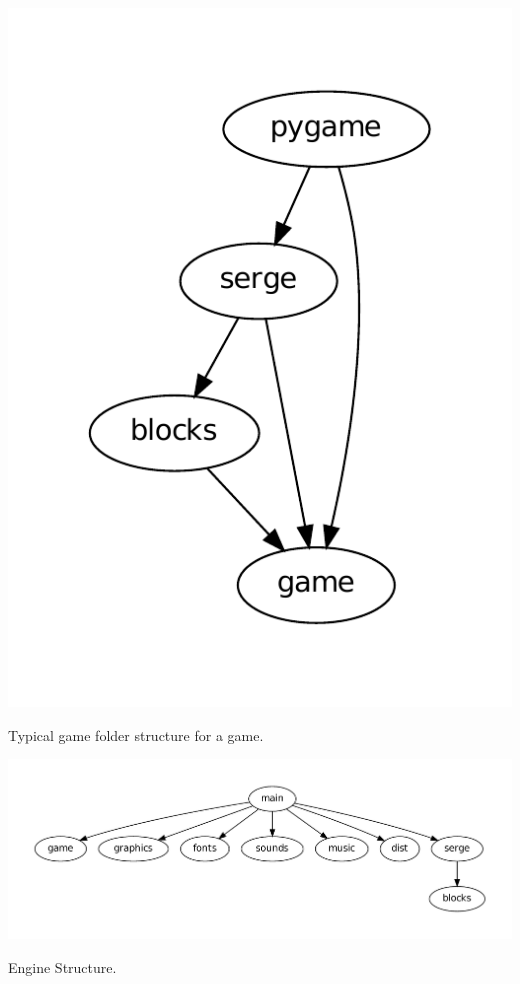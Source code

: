 \documentclass[letterpaper,10pt,english]{sphinxmanual}
\begin{document}
\includegraphics{graphviz-e105d178f146796d84ac12b606890fb9e5d18932.pdf}

Typical game folder structure for a game.

\includegraphics{graphviz-0adf03b837469c93904cfb93fe55dd097116c3d6.pdf}

Engine Structure.
\end{document}
